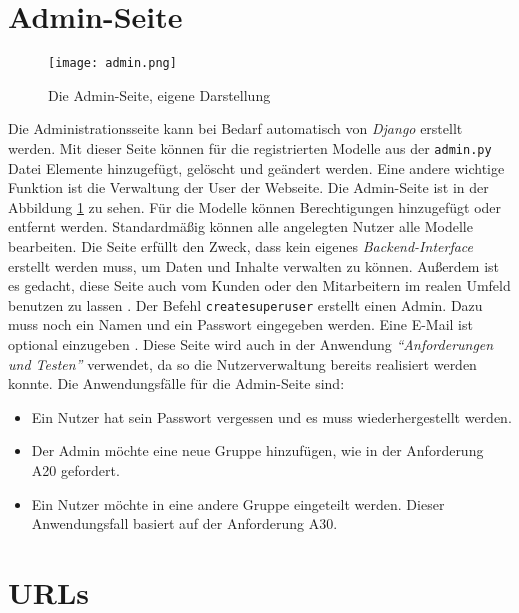 \documentclass[11pt,a4paper]{report}
\begin{document}
\section{Admin-Seite}


\begin{figure}[htpb]
  \centering
  \texttt{[image: admin.png]}
  \caption{Die Admin-Seite, eigene Darstellung}
  \label{f:admin}
\end{figure}

Die Administrationsseite kann bei Bedarf automatisch von \textit{Django} erstellt werden. Mit dieser Seite können für die registrierten Modelle aus der \verb|admin.py| Datei Elemente hinzugefügt, gelöscht und geändert werden. Eine andere wichtige Funktion ist die Verwaltung der User der Webseite. Die Admin-Seite ist in der Abbildung \ref{f:admin} zu sehen. Für die Modelle können Berechtigungen hinzugefügt oder entfernt werden. Standardmäßig können alle angelegten Nutzer alle Modelle bearbeiten. Die Seite erfüllt den Zweck, dass kein eigenes \textit{Backend-Interface} erstellt werden muss, um Daten und Inhalte verwalten zu können. Außerdem ist es gedacht, diese Seite auch vom Kunden oder den Mitarbeitern im realen Umfeld benutzen zu lassen \cite{djangotuto4}. Der Befehl \verb|createsuperuser| erstellt einen Admin. Dazu muss noch ein Namen und ein Passwort eingegeben werden. Eine E-Mail ist optional einzugeben \cite{mozillatuto6}. Diese Seite wird auch in der Anwendung \textit{"`Anforderungen und Testen"'} verwendet, da so die Nutzerverwaltung bereits realisiert werden konnte. Die Anwendungsfälle für die Admin-Seite sind:
\begin{itemize}
\item Ein Nutzer hat sein Passwort vergessen und es muss wiederhergestellt werden.
\item Der Admin möchte eine neue Gruppe hinzufügen, wie in der Anforderung A20 gefordert.

\item Ein Nutzer möchte in eine andere Gruppe eingeteilt werden. Dieser Anwendungsfall basiert auf der Anforderung A30.

\end{itemize}





\section{URLs}
\label{s:iurl}
\end{document}
